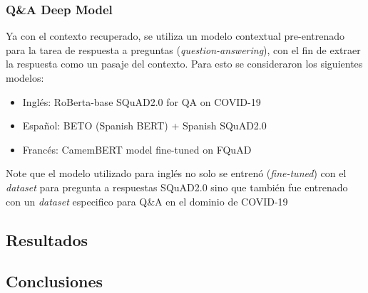 \subsubsection{Q\&A Deep Model}

Ya con el contexto recuperado, se utiliza un modelo contextual pre-entrenado para la tarea de respuesta a preguntas (\textit{question-answering}), con el fin de extraer la respuesta como un pasaje del contexto. Para esto se consideraron los siguientes modelos:

\begin{itemize}
    \item Inglés: RoBerta-base SQuAD2.0 for QA on COVID-19
    
    \item Español: BETO (Spanish BERT) + Spanish SQuAD2.0
    
    \item Francés: CamemBERT model fine-tuned on FQuAD
\end{itemize}

Note que el modelo utilizado para inglés no solo se entrenó (\textit{fine-tuned}) con el \textit{dataset} para pregunta a respuestas SQuAD2.0 sino que también fue entrenado con un \textit{dataset} especifico para Q\&A en el dominio de COVID-19 \cite{}

\subsection{Resultados}


\subsection{Conclusiones}

\newpage